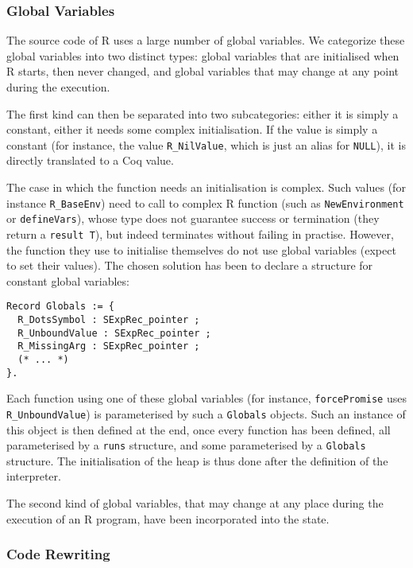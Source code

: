 \documentclass{article}
\newcommand\Coq{Coq}
\newcommand\R{R}
\begin{document}
\subsubsection{Global Variables}

The source code of \R{} uses a large number of global variables.
We categorize these global variables into two distinct types:
global variables that are initialised when \R{} starts, then never changed,
and global variables that may change at any point during the execution.

The first kind can then be separated into two subcategories:
either it is simply a constant, either it needs some complex initialisation.
If the value is simply a constant
(for instance, the value \texttt{R_NilValue},
which is just an alias for \texttt{NULL}),
it is directly translated to a \Coq{} value.

The case in which the function needs an initialisation is complex.
Such values (for instance \texttt{R_BaseEnv})
need to call to complex \R{} function
(such as \texttt{NewEnvironment} or \texttt{defineVars}),
whose type does not guarantee success or termination
(they return a \texttt{result T}),
but indeed terminates without failing in practise.
However, the function they use to initialise themselves
do not use global variables (expect to set their values).
The chosen solution has been to declare a structure for
constant global variables:
\begin{verbatim}
Record Globals := {
  R_DotsSymbol : SExpRec_pointer ;
  R_UnboundValue : SExpRec_pointer ;
  R_MissingArg : SExpRec_pointer ;
  (* ... *)
}.
\end{verbatim}
Each function using one of these global variables
(for instance, \texttt{forcePromise}
uses \texttt{R_UnboundValue})
is parameterised by such a \texttt{Globals}
objects.
Such an instance of this object is then defined at the end,
once every function has been defined,
all parameterised by a \texttt{runs} structure,
and some parameterised by a \texttt{Globals} structure.
The initialisation of the heap is thus done after
the definition of the interpreter.

The second kind of global variables,
that may change at any place during the execution of an \R{} program,
have been incorporated into the state.



\subsubsection{Code Rewriting}
\end{document}
